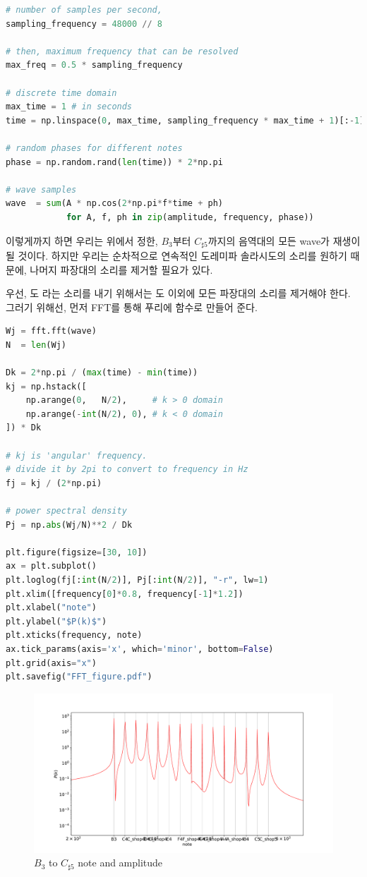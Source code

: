 \documentclass[11pt]{article}
\begin{document}
\begin{lstlisting}[language=Python]
# number of samples per second,
sampling_frequency = 48000 // 8

# then, maximum frequency that can be resolved
max_freq = 0.5 * sampling_frequency

# discrete time domain
max_time = 1 # in seconds
time = np.linspace(0, max_time, sampling_frequency * max_time + 1)[:-1]

# random phases for different notes
phase = np.random.rand(len(time)) * 2*np.pi

# wave samples
wave  = sum(A * np.cos(2*np.pi*f*time + ph) 
            for A, f, ph in zip(amplitude, frequency, phase))
\end{lstlisting}
이렇게까지 하면 우리는 위에서 정한,  $B_3$부터 $C_{\sharp5}$까지의 음역대의 모든 wave가 재생이 될 것이다. 하지만 우리는 순차적으로 연속적인 도레미파 솔라시도의 소리를 원하기 때문에, 나머지 파장대의 소리를 제거할 필요가 있다.

우선, 도 라는 소리를 내기 위해서는 도 이외에 모든 파장대의 소리를 제거해야 한다. 그러기 위해선, 먼저 FFT를 통해 푸리에 함수로 만들어 준다.

\begin{lstlisting}[language=Python]
Wj = fft.fft(wave)
N  = len(Wj)

Dk = 2*np.pi / (max(time) - min(time))
kj = np.hstack([
    np.arange(0,   N/2),     # k > 0 domain
    np.arange(-int(N/2), 0), # k < 0 domain
]) * Dk

# kj is 'angular' frequency.
# divide it by 2pi to convert to frequency in Hz
fj = kj / (2*np.pi)

# power spectral density
Pj = np.abs(Wj/N)**2 / Dk

plt.figure(figsize=[30, 10])
ax = plt.subplot()
plt.loglog(fj[:int(N/2)], Pj[:int(N/2)], "-r", lw=1)
plt.xlim([frequency[0]*0.8, frequency[-1]*1.2])
plt.xlabel("note")
plt.ylabel("$P(k)$")
plt.xticks(frequency, note)
ax.tick_params(axis='x', which='minor', bottom=False)
plt.grid(axis="x")
plt.savefig("FFT_figure.pdf")
\end{lstlisting}

\begin{figure}[!ht]
  \centering
  \includegraphics[width=1\textwidth]{FFT_figure.pdf}
  \caption{$B_{3}$ to $C_{\sharp5}$  note and amplitude}
\end{figure}
\end{document}
